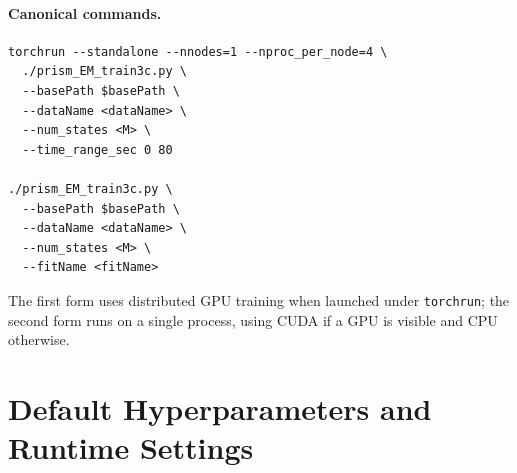\documentclass[11pt]{article}
\begin{document}
\paragraph{Canonical commands.}
\begin{verbatim}
torchrun --standalone --nnodes=1 --nproc_per_node=4 \
  ./prism_EM_train3c.py \
  --basePath $basePath \
  --dataName <dataName> \
  --num_states <M> \
  --time_range_sec 0 80

./prism_EM_train3c.py \
  --basePath $basePath \
  --dataName <dataName> \
  --num_states <M> \
  --fitName <fitName>
\end{verbatim}

The first form uses distributed GPU training when launched under
\texttt{torchrun}; the second form runs on a single process, using CUDA if a
GPU is visible and CPU otherwise.

\section{Default Hyperparameters and Runtime Settings}
\label{sec:defaults}
\end{document}
